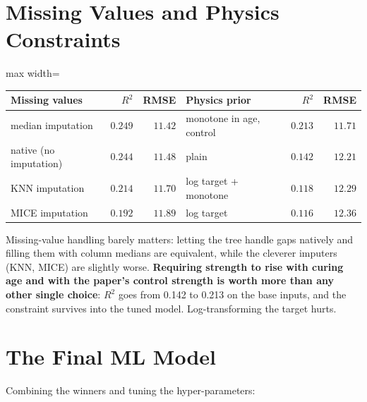 \documentclass[11pt]{article}
\newcommand{\R}{$R^2$}
\begin{document}
\section{Missing Values and Physics Constraints}
\label{sec:rcf-p3-priors}
\begin{center}\small
\begin{adjustbox}{max width=\linewidth}
\begin{tabular}{lrr@{\hskip 2em}lrr}
\toprule
Missing values & \R{} & RMSE & Physics prior & \R{} & RMSE \\
\midrule
\rowcolor{green!12}median imputation & $\mathbf{0.249}$ & $11.42$ & \cellcolor{green!12}monotone in age, control & \cellcolor{green!12}$\mathbf{0.213}$ & \cellcolor{green!12}$11.71$ \\
native (no imputation) & $0.244$ & $11.48$ & plain & $0.142$ & $12.21$ \\
KNN imputation & $0.214$ & $11.70$ & log target + monotone & $0.118$ & $12.29$ \\
MICE imputation & $0.192$ & $11.89$ & log target & $0.116$ & $12.36$ \\
\bottomrule
\end{tabular}
\end{adjustbox}
\end{center}

\noindent Missing-value handling barely matters: letting the tree handle gaps natively and
filling them with column medians are equivalent, while the cleverer imputers (KNN, MICE)
are slightly worse. \textbf{Requiring strength to rise with curing age and with the
paper's control strength is worth more than any other single choice}: \R{} goes from
0.142 to 0.213 on the base inputs, and the constraint survives into the tuned model.
Log-transforming the target hurts.

\section{The Final ML Model}
\label{sec:rcf-p3-final}
Combining the winners and tuning the hyper-parameters:
\end{document}
